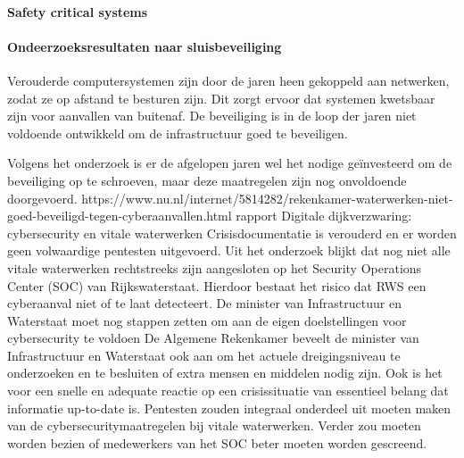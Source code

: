 \paragraph{Safety critical systems}
\cite{winceckCriticalToSafety}
\cite{chambersHazardAnalysisSCS}
\cite{rslater1998SCSAnalysis}
\cite{knightchallengessafetyCritical}
\cite{johnson2006devsafetycritical}
\cite{daucriticalsafetyconsider}
\cite{fallsafedesign}
\cite{arForce2015VerificationExpectations}
\cite{nebulaassessment}
\cite{lalaArchitecturalPrinciples}
\cite{mitNotesSafetyCritical}
\cite{britishColumbia2020GuideSafetyCritical}
\cite{fulvio1993safetycriticalsystems}
\cite{dlrtabid}
\cite{knight2010SafetyCritical}
\cite{creavisafecritical}
\cite{valdes2018SafetybyAutomation}
\cite{2015whensafetymanagementsystemsfail}
\paragraph{Ondeerzoeksresultaten naar sluisbeveiliging}



Verouderde computersystemen zijn door de jaren heen gekoppeld aan netwerken, zodat ze op afstand te besturen zijn. Dit zorgt ervoor dat systemen kwetsbaar zijn voor aanvallen van buitenaf. De beveiliging is in de loop der jaren niet voldoende ontwikkeld om de infrastructuur goed te beveiligen.

Volgens het onderzoek is er de afgelopen jaren wel het nodige geïnvesteerd om de beveiliging op te schroeven, maar deze maatregelen zijn nog onvoldoende doorgevoerd.
https://www.nu.nl/internet/5814282/rekenkamer-waterwerken-niet-goed-beveiligd-tegen-cyberaanvallen.html
\cite{hdsr30092022lichtprojectieswaterliniesluizen}
rapport Digitale dijkverzwaring: cybersecurity en vitale waterwerken 
Crisisdocumentatie is verouderd en er worden geen volwaardige pentesten uitgevoerd. Uit het onderzoek blijkt dat nog niet alle vitale waterwerken rechtstreeks zijn aangesloten op het Security Operations Center (SOC) van Rijkswaterstaat. Hierdoor bestaat het risico dat RWS een cyberaanval niet of te laat detecteert. De minister van Infrastructuur en Waterstaat moet nog stappen zetten om aan de eigen doelstellingen voor cybersecurity te voldoen
De Algemene Rekenkamer beveelt de minister van Infrastructuur en Waterstaat ook aan om het actuele dreigingsniveau te onderzoeken en te besluiten of extra mensen en middelen nodig zijn. Ook is het voor een snelle en adequate reactie op een crisissituatie van essentieel belang dat informatie up-to-date is. Pentesten zouden integraal onderdeel uit moeten maken van de cybersecuritymaatregelen bij vitale waterwerken. Verder zou moeten worden bezien of medewerkers van het SOC beter moeten worden gescreend.

